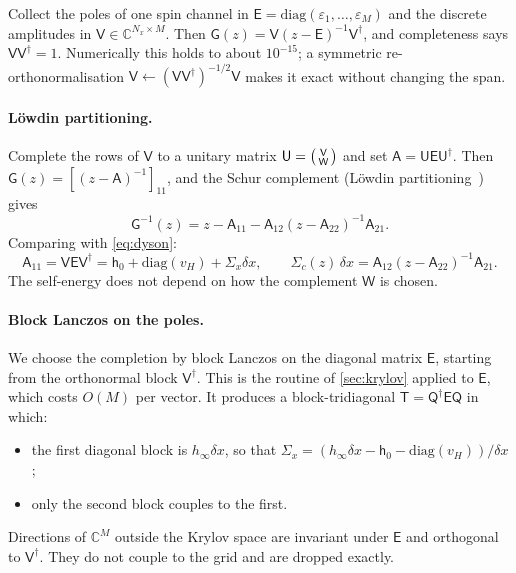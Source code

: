 \documentclass[11pt,a4paper]{article}
\newcommand{\dx}{\delta x}
\newcommand{\mat}[1]{\mathsf{#1}}
\newcommand{\Nx}{N_x}
\begin{document}
Collect the poles of one spin channel in $\mat E=\mathrm{diag}(\varepsilon_1,\dots,\varepsilon_M)$ and the discrete amplitudes in $\mat V\in\mathbb C^{\Nx\times M}$. Then $\mat G(z) = \mat V(z-\mat E)^{-1}\mat V^\dagger$, and completeness says $\mat V\mat V^\dagger = 1$. Numerically this holds to about $10^{-15}$; a symmetric re-orthonormalisation $\mat V\leftarrow(\mat V\mat V^\dagger)^{-1/2}\mat V$ makes it exact without changing the span.

\paragraph{Löwdin partitioning.} Complete the rows of $\mat V$ to a unitary matrix $\mat U = \begin{psmallmatrix}\mat V\\ \mat W\end{psmallmatrix}$ and set $\mat A = \mat U\mat E\mat U^\dagger$. Then $\mat G(z) = [(z-\mat A)^{-1}]_{11}$, and the Schur complement (Löwdin partitioning~\cite{lowdin1962}) gives
\begin{equation}
\mat G^{-1}(z) = z - \mat A_{11} - \mat A_{12}(z-\mat A_{22})^{-1}\mat A_{21}.
\end{equation}
Comparing with \cref{eq:dyson}:
\begin{equation}
\mat A_{11} = \mat V\mat E\mat V^\dagger = \mat h_0 + \mathrm{diag}(v_H) + \Sigma_x\dx, \qquad \Sigma_c(z)\,\dx = \mat A_{12}(z-\mat A_{22})^{-1}\mat A_{21}.
\label{eq:partition}
\end{equation}
The self-energy does not depend on how the complement $\mat W$ is chosen.

\paragraph{Block Lanczos on the poles.} We choose the completion by block Lanczos on the diagonal matrix $\mat E$, starting from the orthonormal block $\mat V^\dagger$. This is the routine of \cref{sec:krylov} applied to $\mat E$, which costs $O(M)$ per vector. It produces a block-tridiagonal $\mat T = \mat Q^\dagger\mat E\mat Q$ in which:
\begin{itemize}
\item the first diagonal block is $h_\infty\dx$, so that $\Sigma_x = (h_\infty\dx - \mat h_0 - \mathrm{diag}(v_H))/\dx$;
\item only the second block couples to the first.
\end{itemize}
Directions of $\mathbb C^M$ outside the Krylov space are invariant under $\mat E$ and orthogonal to $\mat V^\dagger$. They do not couple to the grid and are dropped exactly.
\end{document}
